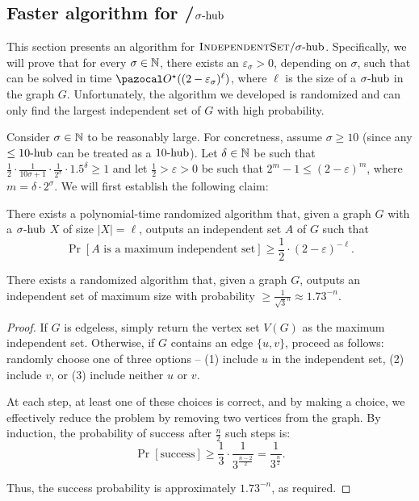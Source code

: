 \subsection{Faster algorithm for /$\shub$}
\label{section:indset-shub}

This section presents an algorithm for $\prob{IndependentSet}/\shub$. Specifically, we will prove that for every $\sigma \in \N$, there exists an $\varepsilon_{\sigma} > 0$, depending on $\sigma$, such that  can be solved in time $\O^\star((2-\varepsilon_{\sigma})^\ell)$, where $\ell$ is the size of a $\shub$ in the graph $G$. Unfortunately, the algorithm we developed is randomized and can only find the largest independent set of $G$ with high probability.

\medskip

\def\kl{\kappa^\text{large}}

Consider $\sigma \in \N$ to be reasonably large. For concretness, assume $\sigma \geq 10$ (since any $\shub[\leq 10]$ can be treated as a $\shub[10]$). Let $\delta \in \N$ be such that $\frac{1}{2}\cdot \frac{1}{10\sigma + 1}\cdot \frac{1}{2^\sigma}\cdot1.5^\delta \geq 1$ and let $\frac{1}{2} > \varepsilon > 0$ be such that $2^m - 1 \leq (2 - \varepsilon)^m$, where $m = \delta \cdot 2^\sigma$. We will first establish the following claim:

\begin{claim}
    \label{claim:random-algo-indset}
    There exists a polynomial-time randomized algorithm that, given a graph $G$ with a $\shub$ $X$ of size $|X| = \ell$, outputs an independent set $A$ of $G$ such that $$\Pr[A \text{ is a maximum independent set}] \geq \frac{1}{2}\cdot (2-\varepsilon)^{-\ell}.$$
\end{claim}

\begin{lemma}
    \label{lemma:random-algo-indset}
    There exists a randomized algorithm that, given a graph $G$, outputs an independent set of maximum size with probability $\geq \frac{1}{\sqrt{3}^n} \approx 1.73^{-n}$.
\end{lemma}

\begin{proof}
    If $G$ is edgeless, simply return the vertex set $V(G)$ as the maximum independent set. Otherwise, if $G$ contains an edge $\{u, v\}$, proceed as follows: randomly choose one of three options -- (1) include $u$ in the independent set, (2) include $v$, or (3) include neither $u$ or $v$.
    
    At each step, at least one of these choices is correct, and by making a choice, we effectively reduce the problem by removing two vertices from the graph. By induction, the probability of success after $\frac{n}{2}$ such steps is: $$\Pr[\text{success}] \geq \frac{1}{3}\cdot \frac{1}{3^{\frac{n-2}{2}}} = \frac{1}{3^{\frac{n}{2}}}.$$

    Thus, the success probability is approximately $1.73^{-n}$, as required.
\end{proof}

